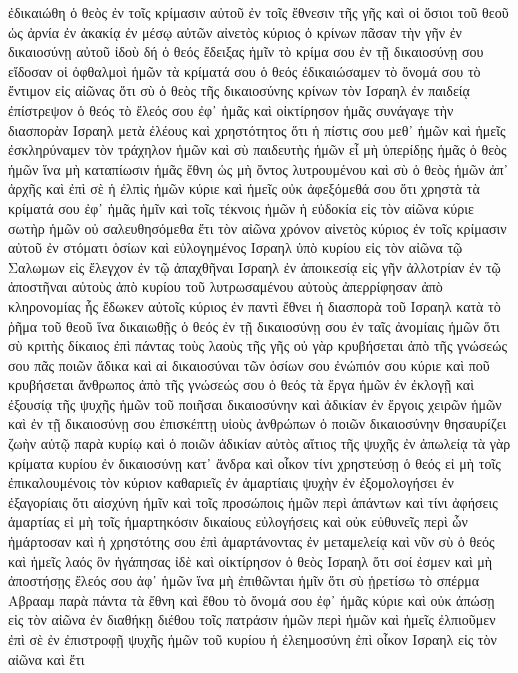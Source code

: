 ἐδικαιώθη ὁ θεὸς ἐν τοῖς κρίμασιν αὐτοῦ ἐν τοῖς ἔθνεσιν τῆς γῆς καὶ οἱ ὅσιοι τοῦ θεοῦ ὡς ἀρνία ἐν ἀκακίᾳ ἐν μέσῳ αὐτῶν
αἰνετὸς κύριος ὁ κρίνων πᾶσαν τὴν γῆν ἐν δικαιοσύνῃ αὐτοῦ
ἰδοὺ δή ὁ θεός ἔδειξας ἡμῖν τὸ κρίμα σου ἐν τῇ δικαιοσύνῃ σου εἴδοσαν οἱ ὀφθαλμοὶ ἡμῶν τὰ κρίματά σου ὁ θεός
ἐδικαιώσαμεν τὸ ὄνομά σου τὸ ἔντιμον εἰς αἰῶνας ὅτι σὺ ὁ θεὸς τῆς δικαιοσύνης κρίνων τὸν Ισραηλ ἐν παιδείᾳ
ἐπίστρεψον ὁ θεός τὸ ἔλεός σου ἐφ᾽ ἡμᾶς καὶ οἰκτίρησον ἡμᾶς
συνάγαγε τὴν διασπορὰν Ισραηλ μετὰ ἐλέους καὶ χρηστότητος ὅτι ἡ πίστις σου μεθ᾽ ἡμῶν
καὶ ἡμεῖς ἐσκληρύναμεν τὸν τράχηλον ἡμῶν καὶ σὺ παιδευτὴς ἡμῶν εἶ
μὴ ὑπερίδῃς ἡμᾶς ὁ θεὸς ἡμῶν ἵνα μὴ καταπίωσιν ἡμᾶς ἔθνη ὡς μὴ ὄντος λυτρουμένου
καὶ σὺ ὁ θεὸς ἡμῶν ἀπ᾽ ἀρχῆς καὶ ἐπὶ σὲ ἡ ἐλπὶς ἡμῶν κύριε
καὶ ἡμεῖς οὐκ ἀφεξόμεθά σου ὅτι χρηστὰ τὰ κρίματά σου ἐφ᾽ ἡμᾶς
ἡμῖν καὶ τοῖς τέκνοις ἡμῶν ἡ εὐδοκία εἰς τὸν αἰῶνα κύριε σωτὴρ ἡμῶν οὐ σαλευθησόμεθα ἔτι τὸν αἰῶνα χρόνον
αἰνετὸς κύριος ἐν τοῖς κρίμασιν αὐτοῦ ἐν στόματι ὁσίων καὶ εὐλογημένος Ισραηλ ὑπὸ κυρίου εἰς τὸν αἰῶνα
τῷ Σαλωμων εἰς ἔλεγχον
ἐν τῷ ἀπαχθῆναι Ισραηλ ἐν ἀποικεσίᾳ εἰς γῆν ἀλλοτρίαν ἐν τῷ ἀποστῆναι αὐτοὺς ἀπὸ κυρίου τοῦ λυτρωσαμένου αὐτοὺς ἀπερρίφησαν ἀπὸ κληρονομίας ἧς ἔδωκεν αὐτοῖς κύριος
ἐν παντὶ ἔθνει ἡ διασπορὰ τοῦ Ισραηλ κατὰ τὸ ῥῆμα τοῦ θεοῦ ἵνα δικαιωθῇς ὁ θεός ἐν τῇ δικαιοσύνῃ σου ἐν ταῖς ἀνομίαις ἡμῶν ὅτι σὺ κριτὴς δίκαιος ἐπὶ πάντας τοὺς λαοὺς τῆς γῆς
οὐ γὰρ κρυβήσεται ἀπὸ τῆς γνώσεώς σου πᾶς ποιῶν ἄδικα καὶ αἱ δικαιοσύναι τῶν ὁσίων σου ἐνώπιόν σου κύριε καὶ ποῦ κρυβήσεται ἄνθρωπος ἀπὸ τῆς γνώσεώς σου ὁ θεός
τὰ ἔργα ἡμῶν ἐν ἐκλογῇ καὶ ἐξουσίᾳ τῆς ψυχῆς ἡμῶν τοῦ ποιῆσαι δικαιοσύνην καὶ ἀδικίαν ἐν ἔργοις χειρῶν ἡμῶν καὶ ἐν τῇ δικαιοσύνῃ σου ἐπισκέπτῃ υἱοὺς ἀνθρώπων
ὁ ποιῶν δικαιοσύνην θησαυρίζει ζωὴν αὑτῷ παρὰ κυρίῳ καὶ ὁ ποιῶν ἀδικίαν αὐτὸς αἴτιος τῆς ψυχῆς ἐν ἀπωλείᾳ τὰ γὰρ κρίματα κυρίου ἐν δικαιοσύνῃ κατ᾽ ἄνδρα καὶ οἶκον
τίνι χρηστεύσῃ ὁ θεός εἰ μὴ τοῖς ἐπικαλουμένοις τὸν κύριον καθαριεῖς ἐν ἁμαρτίαις ψυχὴν ἐν ἐξομολογήσει ἐν ἐξαγορίαις ὅτι αἰσχύνη ἡμῖν καὶ τοῖς προσώποις ἡμῶν περὶ ἁπάντων
καὶ τίνι ἀφήσεις ἁμαρτίας εἰ μὴ τοῖς ἡμαρτηκόσιν δικαίους εὐλογήσεις καὶ οὐκ εὐθυνεῖς περὶ ὧν ἡμάρτοσαν καὶ ἡ χρηστότης σου ἐπὶ ἁμαρτάνοντας ἐν μεταμελείᾳ
καὶ νῦν σὺ ὁ θεός καὶ ἡμεῖς λαός ὃν ἠγάπησας ἰδὲ καὶ οἰκτίρησον ὁ θεὸς Ισραηλ ὅτι σοί ἐσμεν καὶ μὴ ἀποστήσῃς ἔλεός σου ἀφ᾽ ἡμῶν ἵνα μὴ ἐπιθῶνται ἡμῖν
ὅτι σὺ ᾑρετίσω τὸ σπέρμα Αβρααμ παρὰ πάντα τὰ ἔθνη καὶ ἔθου τὸ ὄνομά σου ἐφ᾽ ἡμᾶς κύριε καὶ οὐκ ἀπώσῃ εἰς τὸν αἰῶνα
ἐν διαθήκῃ διέθου τοῖς πατράσιν ἡμῶν περὶ ἡμῶν καὶ ἡμεῖς ἐλπιοῦμεν ἐπὶ σὲ ἐν ἐπιστροφῇ ψυχῆς ἡμῶν
τοῦ κυρίου ἡ ἐλεημοσύνη ἐπὶ οἶκον Ισραηλ εἰς τὸν αἰῶνα καὶ ἔτι
